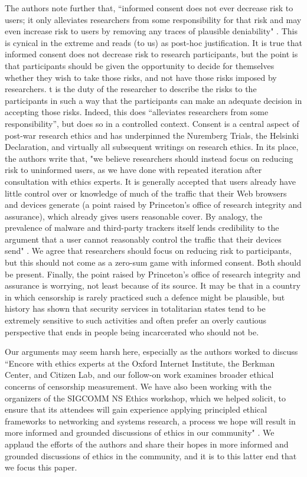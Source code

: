\documentclass{svjour3}                     %
\begin{document}
The authors note further that, ``informed consent does not ever decrease risk to users; it only alleviates researchers from some responsibility for that risk and may even increase risk to users by removing any traces of plausible deniability" \cite[p.~664]{burnett2015encore}. This is cynical in the extreme and reads (to us) as post-hoc justification.  It is true that informed consent does not decrease risk to research participants, but the point is that participants should be given the opportunity to decide for themselves whether they wish to take those risks, and not have those risks imposed by researchers. t is the duty of the researcher to describe the risks to the participants in such a way that the participants can make an adequate decision in accepting those risks. Indeed, this does ``alleviates researchers from some responsibility”, but does so in a controlled context.  Consent is a central aspect of post-war research ethics and has underpinned the Nuremberg Trials, the Helsinki Declaration, and virtually all subsequent writings on research ethics.  In its place, the authors write that, "we believe researchers should instead focus on reducing risk to uninformed users, as we have done with repeated iteration after consultation with ethics experts. It is generally accepted that users already have little control over or knowledge of much of the traffic that their Web browsers and devices generate (a point raised by Princeton’s office of research integrity and assurance), which already gives users reasonable cover. By analogy, the prevalence of malware and third-party trackers itself lends credibility to the argument that a user cannot reasonably control the traffic that their devices send" \cite[p.~664-65]{burnett2015encore}. We agree that researchers should focus on reducing risk to participants, but this should not come as a zero-sum game with informed consent.  Both should be present. Finally, the point raised by Princeton's office of research integrity and assurance is worrying, not least because of its source.  It may be that in a country in which censorship is rarely practiced such a defence might be plausible, but history has shown that security services in totalitarian states tend to be extremely sensitive to such activities and often prefer an overly cautious perspective that ends in people being incarcerated who should not be.

Our arguments may seem harsh here, especially as the authors worked to discuss ``Encore with ethics experts at the Oxford Internet Institute, the Berkman Center, and Citizen Lab, and our follow-on work examines broader ethical concerns of censorship measurement. We have also been working with the organizers of the SIGCOMM NS Ethics workshop, which we helped solicit, to ensure that its attendees will gain experience applying principled ethical frameworks to networking and systems research, a process we hope will result in more informed and grounded discussions of ethics in our community" \cite[p.~664]{burnett2015encore}. We applaud the efforts of the authors and share their hopes in more informed and grounded discussions of ethics in the community, and it is to this latter end that we focus this paper.
\end{document}
